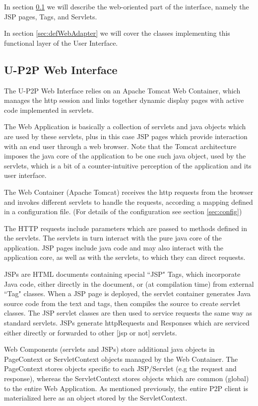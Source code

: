 \documentclass[titlepage]{article}%
\begin{document}
In section \ref{sec:WebUI} we will describe the web-oriented part of the interface, namely the JSP pages, Tags, and Servlets.

In section \ref{sec:defWebAdapter} we will cover the classes implementing this functional layer of the User Interface.

\subsection{U-P2P Web Interface}
\label{sec:WebUI}
The U-P2P Web Interface relies on an Apache Tomcat Web Container, which manages the http session and links together dynamic display pages with active code implemented in servlets.

The Web Application is basically a collection of servlets and java objects which are used by these servlets, plus in this case JSP pages which provide interaction with an end user through a web browser. Note that the Tomcat architecture imposes the java core of the application to be one such java object, used by the servlets, which is a bit of a counter-intuitive perception of the application and its user interface.

The Web Container (Apache Tomcat) receives the http requests from the browser and invokes different servlets to handle the requests, according a mapping defined in a configuration file. (For details of the configuration see section \ref{sec:config})

The HTTP requests include parameters which are passed to methods defined in the servlets. The servlets in turn interact with the pure java core of the application. 
JSP pages include java code and may also interact with the application core, as well as with the servlets, to which they can direct requests.

JSPs are HTML documents containing special ``JSP" Tags, which incorporate Java code, either directly in the document, or (at compilation time) from external ``Tag" classes. When a JSP page is deployed, the servlet container generates Java source code from the text and tags, then compiles the source to create servlet classes. The JSP servlet classes are then used to service requests the same way as standard servlets. JSPs generate httpRequests and Responses which are serviced either directly or forwarded to other [jsp or not] servlets. 

Web Components (servlets and JSPs) store additional java objects in PageContext or ServletContext objects managed by the Web Container.
The PageContext stores objects specific to each JSP/Servlet (e.g the request and response), whereas the ServletContext stores objects which are common (global) to the entire Web Application. As mentioned previously, the entire P2P client is materialized here as an object stored by the ServletContext. 
\end{document}
